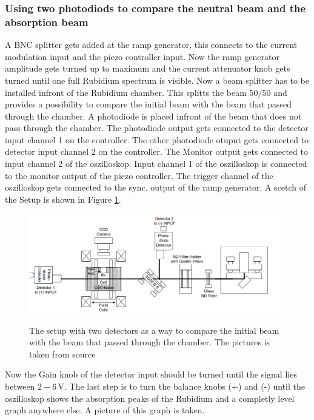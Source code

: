 \subsubsection{Using two photodiods to compare the neutral beam and the absorption beam}
\label{sec:absorptionsspectrum}
A BNC splitter gets added at the ramp generator, this connects to the current modulation input and the piezo controller input.
Now the ramp generator amplitude gets turned up to maximum and the current attenuator knob gets turned until one full Rubidium spectrum is visible.
Now a beam splitter has to be installed infront of the Rubidium chamber.
This splitts the beam $50/50$ and provides a possibility to compare the initial beam with the beam that passed through the chamber.
A photodiode is placed infront of the beam that does not pass through the chamber.
The photodiode output gets connected to the detector input channel 1 on the controller.
The other photodiode otuput gets connected to detector input channel 2 on the controller.
The Monitor output gets connected to input channel 2 of the oszilloskop.
Input channel 1 of the oszilloskop is connected to the monitor output of the piezo controller.
The trigger channel of the oszilloskop gets connected to the sync. output of the ramp generator.
A scetch of the Setup is shown in Figure \ref{fig:setup}.

\begin{figure}
    \centering
    \caption{The setup with two detectors as a way to compare the initial beam with the beam that passed through the chamber. The pictures is taken from source \cite[16]{anleitung_exp}}
    \includegraphics[width=\textwidth]{content/data/setup}
    \label{fig:setup}
\end{figure}

Now the Gain knob of the detector input should be turned until the signal lies between $2-6 \,\si{\volt}$.
The last step is to turn the balance knobs (+) and (-) until the oszilloskop shows the absorption peaks of the Rubidium and a completly level graph anywhere else.
A picture of this graph is taken.

